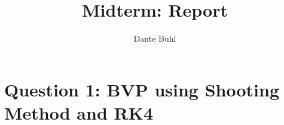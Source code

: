 \documentclass{article}
\title{Midterm: Report}
\author{Dante Buhl}
\begin{document}
\newcommand{\bs}[1]{\boldsymbol{#1}}
\newcommand{\bmp}[1]{\begin{minipage}{#1\textwidth}}
\newcommand{\emp}{\end{minipage}}
\newcommand{\R}{\mathbb{R}}
\newcommand{\C}{\mathbb{C}}
\newcommand{\N}{\mathcal{N}}
\newcommand{\I}{\mathrm{I}}
\newcommand{\K}{\bs{\mathrm{K}}}
\newcommand{\m}{\bs{\mu}_*}
\newcommand{\s}{\bs{\Sigma}_*}
\newcommand{\dt}{\Delta t}
\newcommand{\tr}[1]{\text{Tr}(#1)}
\newcommand{\Tr}[1]{\text{Tr}(#1)}
\newcommand{\hl}[1]{\colorbox{yellow}{#1}}

\maketitle

\section*{Question 1: BVP using Shooting Method and RK4}
\end{document}
